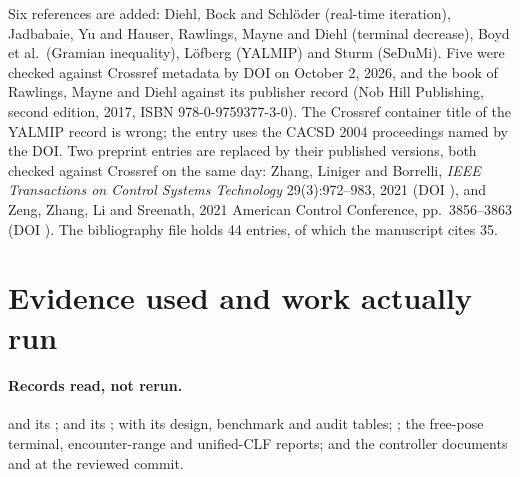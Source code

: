 \documentclass[11pt]{article}
\begin{document}
Six references are added: Diehl, Bock and Schl\"oder (real-time iteration),
Jadbabaie, Yu and Hauser, Rawlings, Mayne and Diehl (terminal decrease),
Boyd et al.\ (Gramian inequality), L\"ofberg (YALMIP) and Sturm (SeDuMi).
Five were checked against Crossref metadata by DOI on October 2, 2026, and
the book of Rawlings, Mayne and Diehl against its publisher record
(Nob Hill Publishing, second edition, 2017, ISBN 978-0-9759377-3-0). The
Crossref container title of the YALMIP record is wrong; the entry uses the
CACSD 2004 proceedings named by the DOI. Two preprint entries are replaced
by their published versions, both checked against Crossref on the same day:
Zhang, Liniger and Borrelli, \emph{IEEE Transactions on Control Systems
Technology} 29(3):972--983, 2021 (DOI ),
and Zeng, Zhang, Li and Sreenath, 2021 American Control Conference,
pp.~3856--3863 (DOI ). The bibliography
file holds 44 entries, of which the manuscript cites 35.

\section{Evidence used and work actually run}
\paragraph{Records read, not rerun.}
 and its
; 
and its ;
 with its design,
benchmark and audit tables; ;
the free-pose terminal, encounter-range and unified-CLF reports; and the
controller documents  and
 at the reviewed commit.
\end{document}
